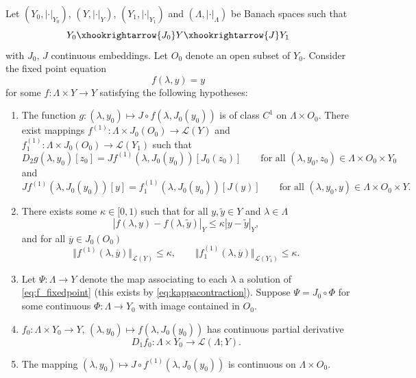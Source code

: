 \documentclass[a4paper, 12pt, oneside, reqno, notitlepage]{amsart}
\theoremstyle{plain}
\theoremstyle{definition}
\theoremstyle{remark}
\begin{document}
Let $(Y_0,|\cdot|_{Y_0})$, $(Y,|\cdot|_Y)$, $(Y_1,|\cdot|_{Y_1})$ and $(\Lambda,|\cdot|_{\Lambda})$ be Banach spaces such that 
\begin{displaymath}
    Y_0 \xhookrightarrow{J_0} Y \xhookrightarrow{J} Y_1
\end{displaymath}
with $J_0$, $J$ continuous embeddings.
Let $O_0$ denote an open subset of $Y_0$.
Consider the fixed point equation
\begin{equation}
   f(\lambda,y) = y
   \label{eq:f_fixedpoint}
\end{equation}
for some $ f : \Lambda \times Y \to Y$ satisfying the following hypotheses:
\begin{enumerate}[label =(Hf.\arabic*)]
    \item \label{Hf1} The function $g:(\lambda,y_0) \mapsto J \circ f(\lambda,J_0(y_0))$ is of class $C^1$ on $\Lambda \times O_0$.
    There exist mappings $f^{(1)} : \Lambda \times J_0(O_0) \to \mathcal{L}(Y)$ and $f^{(1)}_1 : \Lambda \times J_0(O_0) \to \mathcal{L}(Y_1)$ such that
    \begin{displaymath}
        D_2g(\lambda,y_0)[z_0] = Jf^{(1)} (\lambda,J_0(y_0))[J_0(z_0)] \qquad \text{for all } (\lambda,y_0,z_0) \in \Lambda \times O_0 \times Y_0
    \end{displaymath}
    and
    \begin{displaymath}
        Jf^{(1)} (\lambda,J_0(y_0))[y] = f^{(1)}_1(\lambda,J_0(y_0)) [J(y)] \qquad \text{for all } (\lambda,y_0,y) \in \Lambda \times O_0 \times Y.
    \end{displaymath}

    \item \label{Hf2} There exists some $\kappa \in [0,1)$ such that for all $y,\tilde{y} \in Y$ and $\lambda \in \Lambda$
    \begin{equation}
        |f(\lambda,y) - f(\lambda,\tilde{y}) |_Y \leq \kappa |y-\tilde{y}|_Y,
        \label{eq:kappacontraction}
    \end{equation}
    and for all $\overline{y} \in J_0(O_0)$ 
    \begin{displaymath}
        \Vert f^{(1)}(\lambda,\overline{y}) \Vert_{\mathcal{L}(Y)} \leq \kappa, \qquad \Vert f^{(1)}_1(\lambda,\overline{y}) \Vert_{\mathcal{L}(Y_1)} \leq \kappa.
    \end{displaymath}
    \item \label{Hf3} Let $\Psi : \Lambda \to Y$ denote the map associating to each $\lambda$ a solution of \eqref{eq:f_fixedpoint} (this exists by \eqref{eq:kappacontraction}).
    Suppose $\Psi = J_0 \circ \Phi$ for some continuous $\Phi: \Lambda \to Y_0$ with image contained in $O_0$.
    \item \label{Hf4} $f_0 :\Lambda \times Y_0 \to Y$, $(\lambda,y_0) \mapsto f(\lambda,J_0(y_0))$ has continuous partial derivative
    \begin{displaymath}
        D_1f_0: \Lambda \times Y_0 \to \mathcal{L}(\Lambda;Y).
    \end{displaymath}
    \item \label{Hf5} The mapping $(\lambda,y_0) \mapsto J \circ f^{(1)}(\lambda,J_0(y_0))$ is continuous on $\Lambda \times O_0$.
\end{enumerate}
\end{document}
